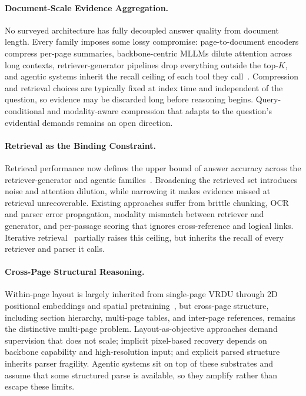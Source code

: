 \documentclass[11pt]{article}
\begin{document}
\paragraph{Document-Scale Evidence Aggregation.}
No surveyed architecture has fully decoupled answer quality from document length. Every family imposes some lossy compromise: page-to-document encoders compress per-page summaries, backbone-centric MLLMs dilute attention across long contexts, retriever-generator pipelines drop everything outside the top-$K$, and agentic systems inherit the recall ceiling of each tool they call~\cite{ma2024mmlongbench}. Compression and retrieval choices are typically fixed at index time and independent of the question, so evidence may be discarded long before reasoning begins. Query-conditional and modality-aware compression that adapts to the question's evidential demands remains an open direction.

\paragraph{Retrieval as the Binding Constraint.}
Retrieval performance now defines the upper bound of answer accuracy across the retriever-generator and agentic families~\cite{liu2024lost}. Broadening the retrieved set introduces noise and attention dilution, while narrowing it makes evidence missed at retrieval unrecoverable. Existing approaches suffer from brittle chunking, OCR and parser error propagation, modality mismatch between retriever and generator, and per-passage scoring that ignores cross-reference and logical links. Iterative retrieval~\cite{wu2025molorag,jain2025simpledoc} partially raises this ceiling, but inherits the recall of every retriever and parser it calls.

\paragraph{Cross-Page Structural Reasoning.}
Within-page layout is largely inherited from single-page VRDU through 2D positional embeddings and spatial pretraining~\cite{ding2025survey}, but cross-page structure, including section hierarchy, multi-page tables, and inter-page references, remains the distinctive multi-page problem. Layout-as-objective approaches demand supervision that does not scale; implicit pixel-based recovery depends on backbone capability and high-resolution input; and explicit parsed structure inherits parser fragility. Agentic systems sit on top of these substrates and assume that some structured parse is available, so they amplify rather than escape these limits.
\end{document}
